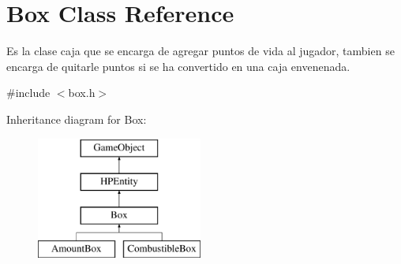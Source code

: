 \hypertarget{class_box}{\section{Box Class Reference}
\label{class_box}
}


Es la clase caja que se encarga de agregar puntos de vida al jugador, tambien se encarga de quitarle puntos si se ha convertido en una caja envenenada.  




{\ttfamily \#include $<$box.\-h$>$}

Inheritance diagram for Box\-:\begin{figure}[H]
\begin{center}
\leavevmode
\includegraphics[height=4.000000cm]{class_box}
\end{center}
\end{figure}
